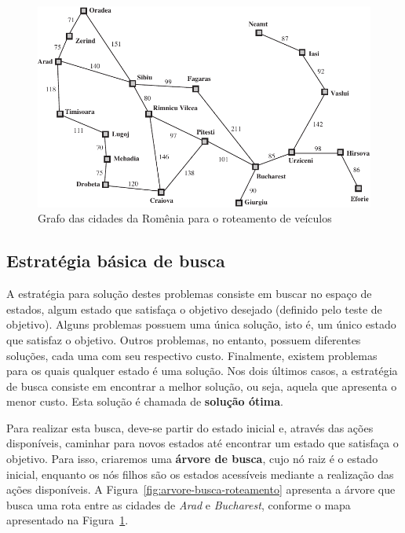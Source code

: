 \begin{figure}[h]
	\centering
	\includegraphics[width=\textwidth]{img/grafo-cidades-roteamento}
	\caption{Grafo das cidades da Romênia para o roteamento de veículos}
	\label{fig:grafo-cidades-roteamento}
\end{figure}

\subsection{Estratégia básica de busca}

A estratégia para solução destes problemas consiste em buscar no espaço de estados, algum estado que satisfaça o objetivo desejado (definido pelo teste de objetivo). Alguns problemas possuem uma única solução, isto é, um único estado que satisfaz o objetivo. Outros problemas, no entanto, possuem diferentes soluções, cada uma com seu respectivo custo. Finalmente, existem problemas para os quais qualquer estado é uma solução. Nos dois últimos casos, a estratégia de busca consiste em encontrar a melhor solução, ou seja, aquela que apresenta o menor custo. Esta solução é chamada de \textbf{solução ótima}.

Para realizar esta busca, deve-se partir do estado inicial e, através das ações disponíveis, caminhar para novos estados até encontrar um estado que satisfaça o objetivo. Para isso, criaremos uma \textbf{árvore de busca}, cujo nó raiz é o estado inicial, enquanto os nós filhos são os estados acessíveis mediante a realização das ações disponíveis. A Figura~\ref{fig:arvore-busca-roteamento} apresenta a árvore que busca uma rota entre as cidades de \textit{Arad} e \textit{Bucharest}, conforme o mapa apresentado na Figura~\ref{fig:grafo-cidades-roteamento}.

